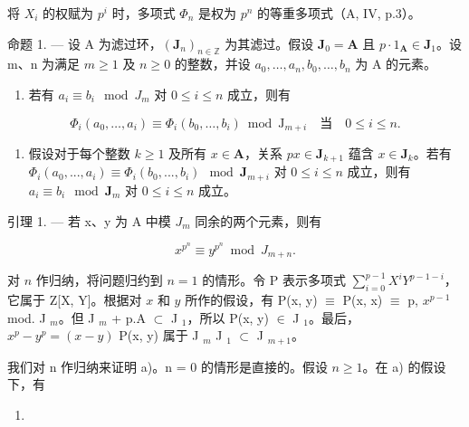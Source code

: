 将 \(X_{i}\) 的权赋为 \(p^{i}\) 时，多项式 \(\Phi_{n}\) 是权为 \(p^{n}\) 的等重多项式（A, IV, p.3）。

命题 1. --- 设 A 为滤过环，\((\mathbf{J}_n)_{n\in \mathbb{Z}}\) 为其滤过。假设 \(\mathbf{J}_0 = \mathbf{A}\) 且 \(p\cdot 1_{\mathbf{A}}\in \mathbf{J}_{1}\)。设 m、n 为满足 \(m\geqslant 1\) 及 \(n\geqslant 0\) 的整数，并设 \(a_0,\dots,a_n,b_0,\dots,b_n\) 为 A 的元素。

\begin{enumerate}
\def\labelenumi{\alph{enumi})}
\tightlist
\item
  若有 \(a_i \equiv b_i \mod J_m\) 对 \(0 \leqslant i \leqslant n\) 成立，则有
\end{enumerate}

\[
\Phi_ {i} (a _ {0}, \dots , a _ {i}) \equiv \Phi_ {i} (b _ {0}, \dots , b _ {i}) \bmod \mathrm{J} _ {m + i} \quad \text{当} \quad 0 \leqslant i \leqslant n.
\]

\begin{enumerate}
\def\labelenumi{\alph{enumi})}
\setcounter{enumi}{1}
\tightlist
\item
  假设对于每个整数 \(k \geqslant 1\) 及所有 \(x \in \mathbf{A}\)，关系 \(p x \in \mathbf{J}_{k+1}\) 蕴含 \(x \in \mathbf{J}_k\)。若有 \(\Phi_i(a_0, ..., a_i) \equiv \Phi_i(b_0, ..., b_i) \mod \mathbf{J}_{m+i}\) 对 \(0 \leqslant i \leqslant n\) 成立，则有 \(a_i \equiv b_i \mod \mathbf{J}_m\) 对 \(0 \leqslant i \leqslant n\) 成立。
\end{enumerate}

引理 1. --- 若 x、y 为 A 中模 \(J_{m}\) 同余的两个元素，则有

\[
x ^ {p ^ {n}} \equiv y ^ {p ^ {n}} \bmod J _ {m + n}.
\]

对 \(n\) 作归纳，将问题归约到 \(n=1\) 的情形。令 P 表示多项式 \(\sum_{i=0}^{p-1} X^i Y^{p-1-i}\)，它属于 Z{[}X, Y{]}。根据对 \(x\) 和 \(y\) 所作的假设，有 P(x, y) \(\equiv\) P(x, x) \(\equiv\) p, \(x^{p-1}\) mod. J \(_m\)。但 J \(_m\) + p.A \(\subset\) J \(_1\)，所以 P(x, y) \(\in\) J \(_1\)。最后，\(x^p - y^p = (x - y)\) P(x, y) 属于 J \(_m\) J \(_1\) \(\subset\) J \(_{m+1}\)。

我们对 n 作归纳来证明 a)。n = 0 的情形是直接的。假设 \(n \geqslant 1\)。在 a) 的假设下，有

\begin{enumerate}
\def\labelenumi{(\arabic{enumi})}
\setcounter{enumi}{3}
\tightlist
\item
\end{enumerate}

